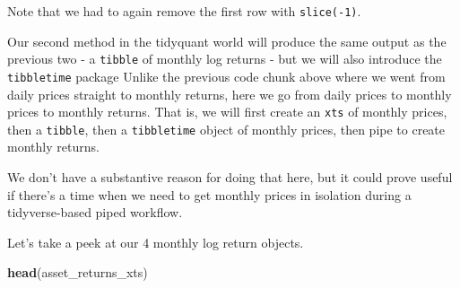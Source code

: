 \documentclass[]{krantz}
\makeatletter
\newenvironment{Shaded}{\begin{snugshade}}{\end{snugshade}}
\newcommand{\KeywordTok}[1]{\textcolor[rgb]{0.13,0.29,0.53}{\textbf{#1}}}
\newcommand{\DataTypeTok}[1]{\textcolor[rgb]{0.13,0.29,0.53}{#1}}
\newcommand{\DecValTok}[1]{\textcolor[rgb]{0.00,0.00,0.81}{#1}}
\newcommand{\StringTok}[1]{\textcolor[rgb]{0.31,0.60,0.02}{#1}}
\newcommand{\OtherTok}[1]{\textcolor[rgb]{0.56,0.35,0.01}{#1}}
\newcommand{\OperatorTok}[1]{\textcolor[rgb]{0.81,0.36,0.00}{\textbf{#1}}}
\newcommand{\NormalTok}[1]{#1}
\newenvironment{kframe}{%
\medskip{}
\setlength{\fboxsep}{.8em}
 \def\at@end@of@kframe{}%
 \ifinner\ifhmode%
  \def\at@end@of@kframe{\end{minipage}}%
  \begin{minipage}{\columnwidth}%
 \fi\fi%
 \def\FrameCommand##1{\hskip\@totalleftmargin \hskip-\fboxsep
 \colorbox{shadecolor}{##1}\hskip-\fboxsep
     \hskip-\linewidth \hskip-\@totalleftmargin \hskip\columnwidth}%
 \MakeFramed {\advance\hsize-\width
   \@totalleftmargin\z@ \linewidth\hsize
   \@setminipage}}%
 {\par\unskip\endMakeFramed%
 \at@end@of@kframe}
\renewenvironment{Shaded}{\begin{kframe}}{\end{kframe}}
\makeatother
\begin{document}
Note that we had to again remove the first row with \texttt{slice(-1)}.

Our second method in the tidyquant world will produce the same output as
the previous two - a \texttt{tibble} of monthly log returns - but we
will also introduce the \texttt{tibbletime} package Unlike the previous
code chunk above where we went from daily prices straight to monthly
returns, here we go from daily prices to monthly prices to monthly
returns. That is, we will first create an \texttt{xts} of monthly
prices, then a \texttt{tibble}, then a \texttt{tibbletime} object of
monthly prices, then pipe to create monthly returns.

We don't have a substantive reason for doing that here, but it could
prove useful if there's a time when we need to get monthly prices in
isolation during a tidyverse-based piped workflow.

\begin{Shaded}
\end{Shaded}

Let's take a peek at our 4 monthly log return objects.

\begin{Shaded}
\begin{Highlighting}[]
\KeywordTok{head}\NormalTok{(asset_returns_xts)}
\end{Highlighting}
\end{Shaded}
\end{document}
